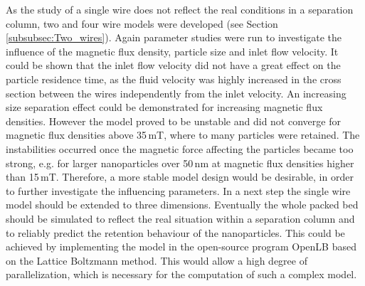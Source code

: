 As the study of a single wire does not reflect the real conditions in a separation column, two and four wire models were developed (see Section \ref{subsubsec:Two_wires}). Again parameter studies were run to investigate the influence of the magnetic flux density, particle size and inlet flow velocity. It could be shown that the inlet flow velocity did not have a great effect on the particle residence time, as the fluid velocity was highly increased in the cross section between the wires independently from the inlet velocity. An increasing size separation effect could be demonstrated for increasing magnetic flux densities. However the model proved to be unstable and did not converge for magnetic flux densities above 35\,mT, where to many particles were retained. The instabilities occurred once the magnetic force affecting the particles became too strong, e.g. for larger nanoparticles over 50\,nm at magnetic flux densities higher than 15\,mT. Therefore, a more stable model design would be desirable, in order to further investigate the influencing parameters. In a next step the single wire model should be extended to three dimensions. Eventually the whole packed bed should be simulated to reflect the real situation within a separation column and to reliably predict the retention behaviour of the nanoparticles. This could be achieved by implementing the model in the open-source program OpenLB based on the Lattice Boltzmann method. This would allow a high degree of parallelization, which is necessary for the computation of such a complex model.     

